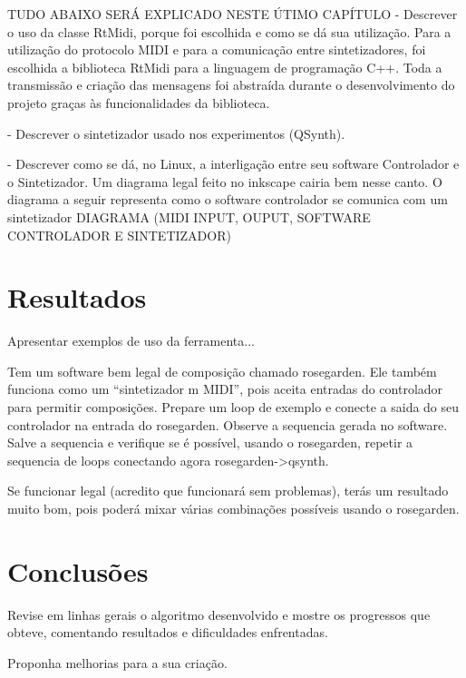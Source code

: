\documentclass[12pt]{report}
\begin{document}
TUDO ABAIXO SERÁ EXPLICADO NESTE ÚTIMO CAPÍTULO
- Descrever o uso da classe RtMidi, porque foi escolhida e como se dá
sua utilização.
Para a utilização do protocolo MIDI e para a comunicação entre sintetizadores, foi escolhida a biblioteca RtMidi para a linguagem de programação C++. Toda a transmissão e criação das mensagens foi abstraída durante o desenvolvimento do projeto graças às funcionalidades da biblioteca.

- Descrever o sintetizador usado nos experimentos (QSynth).

- Descrever como se dá, no Linux, a interligação entre seu software
Controlador e o Sintetizador. Um diagrama legal feito no inkscape
cairia bem nesse canto.
O diagrama a seguir representa como o software controlador se comunica com um sintetizador
DIAGRAMA (MIDI INPUT, OUPUT, SOFTWARE CONTROLADOR E SINTETIZADOR)

\chapter{Resultados}
\label{cha:resultados}

Apresentar exemplos de uso da ferramenta...

Tem um software bem legal de composição chamado rosegarden. Ele também
funciona como um ``sintetizador m MIDI'', pois aceita entradas do
controlador para permitir composições. Prepare um loop de exemplo e
conecte a saida do seu controlador na entrada do rosegarden. Observe a
sequencia gerada no software. Salve a sequencia e verifique se é
possível, usando o rosegarden, repetir a sequencia de loops conectando
agora rosegarden->qsynth.

Se funcionar legal (acredito que funcionará sem problemas), terás um
resultado muito bom, pois poderá mixar várias combinações possíveis
usando o rosegarden.

\chapter{Conclusões}
\label{cha:conclusoes}

Revise em linhas gerais o algoritmo desenvolvido e mostre os
progressos que obteve, comentando resultados e dificuldades
enfrentadas.

Proponha melhorias para a sua criação.


\end{document}
